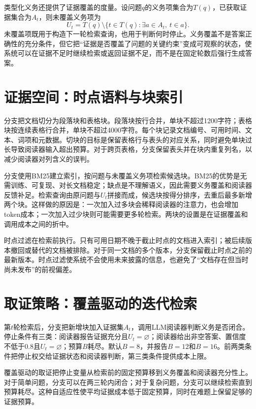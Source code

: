 类型化义务还提供了证据覆盖的度量。设问题$q$的义务项集合为$T(q)$，已获取证据集合为$A_t$，则未覆盖义务项为
\begin{equation}
U_t=T(q)\setminus\{t\in T(q):\exists a\in A_t,\ t\in a\}.
\end{equation}
未覆盖项既用于构造下一轮检索查询，也用于判断何时停止。义务覆盖不是答案正确性的充分条件，但它把“证据是否覆盖了问题的关键约束”变成可观察的状态，使系统可以在证据不足时继续检索或返回证据不足，而不是在固定轮数后强行生成答案。

\section{证据空间：时点语料与块索引}

分支把文档切分为段落块和表格块。段落块按行合并，单块不超过1200字符；表格块按连续表格行合并，单块不超过4000字符。每个块记录文档编号、可用时间、文本、词项和元数据。切块的目标是保留表格行与表头的对应关系，同时避免单块过长导致阅读器输入超出预算。对于跨页表格，分支保留表头并在块内重复列名，以减少阅读器对列含义的误判。

分支使用BM25建立索引，按问题与未覆盖义务项检索候选块。BM25的优势是无需训练、可复现、对长文档稳定；缺点是不理解语义，因此需要义务覆盖和阅读器反馈补足。检索查询由原问题与$U_t$拼接而成，候选块按得分排序，去重后最多新增两个块。这样做的原因是：一次加入过多块会稀释阅读器的注意力，也会增加token成本；一次加入过少块则可能需要更多轮检索。两块的设置是在证据覆盖和调用成本之间的折中。

时点过滤在检索前执行。只有可用日期不晚于截止时点的文档进入索引；被后续版本撤回或替代的文档被排除。对于同一文档的多个版本，分支保留截止时点之前的最新版本。时点过滤使系统不会使用未来披露的信息，也避免了“文档存在但当时尚未发布”的前视偏差。

\section{取证策略：覆盖驱动的迭代检索}

第$t$轮检索后，分支把新增块加入证据集$A_t$，调用LLM阅读器判断义务是否闭合。停止条件有三类：阅读器报告证据充分且$U_t=\varnothing$；阅读器给出非空答案、置信度不低于0.8且$U_t=\varnothing$；预算$B$耗尽。默认$B=8$，并报告$B=12$和$B=16$。前两类条件把停止权交给证据状态和阅读器判断，第三类条件提供成本上限。

覆盖驱动的取证把停止变量从检索前的固定预算移到义务覆盖和阅读器充分性上。对于简单问题，分支可以在两三轮内闭合；对于复杂问题，分支可以继续检索直到预算耗尽。这种自适应性使平均证据成本低于固定预算，同时在难题上保留足够的证据预算。

